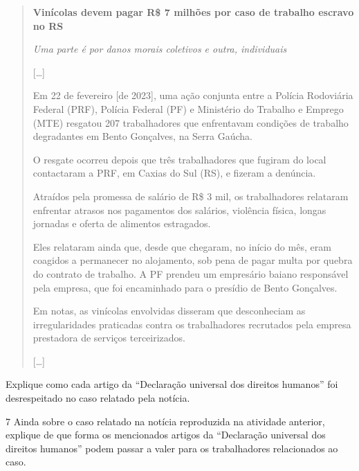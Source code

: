 \begin{quote}
\textbf{Vinícolas devem pagar R\$ 7 milhões por caso de trabalho escravo no RS}

\emph{Uma parte é por danos morais coletivos e outra, individuais}

{[}\ldots{}{]}

Em 22 de fevereiro {[}de 2023{]}, uma ação conjunta entre a Polícia
Rodoviária Federal (PRF), Polícia Federal (PF) e Ministério do Trabalho
e Emprego (MTE) resgatou 207 trabalhadores que enfrentavam condições de
trabalho degradantes em Bento Gonçalves, na Serra Gaúcha.

O resgate ocorreu depois que três trabalhadores que fugiram do local
contactaram a PRF, em Caxias do Sul (RS), e fizeram a denúncia.

Atraídos pela promessa de salário de R\$ 3 mil, os trabalhadores
relataram enfrentar atrasos nos pagamentos dos salários, violência
física, longas jornadas e oferta de alimentos estragados.

Eles relataram ainda que, desde que chegaram, no início do mês, eram
coagidos a permanecer no alojamento, sob pena de pagar multa por quebra
do contrato de trabalho. A PF prendeu um empresário baiano responsável
pela empresa, que foi encaminhado para o presídio de Bento Gonçalves.

Em notas, as vinícolas envolvidas disseram que desconheciam as
irregularidades praticadas contra os trabalhadores recrutados pela
empresa prestadora de serviços terceirizados.

{[}\ldots{}{]}

\end{quote}

Explique como cada artigo da ``Declaração universal dos direitos
humanos'' foi desrespeitado no caso relatado pela notícia.


\num{7} Ainda sobre o caso relatado na notícia reproduzida na atividade
anterior, explique de que forma os mencionados artigos da ``Declaração
universal dos direitos humanos'' podem passar a valer para os
trabalhadores relacionados ao caso.

